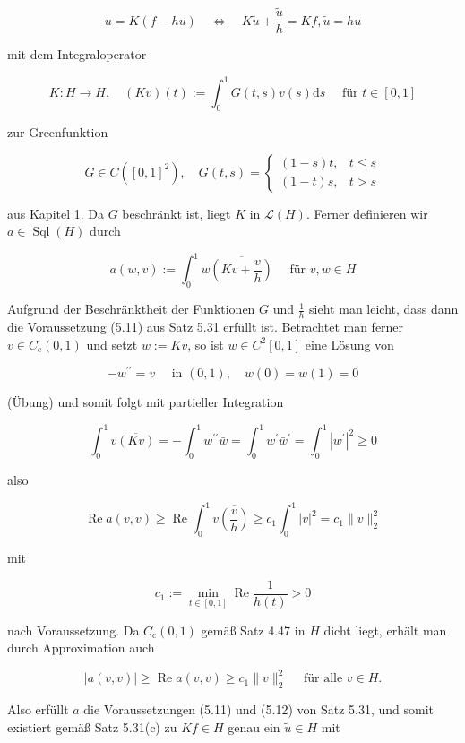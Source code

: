 \documentclass[10pt, letterpaper]{article}
\begin{document}
$$
u=K(f-h u) \quad \Longleftrightarrow \quad K \tilde{u}+\frac{\tilde{u}}{h}=K f, \tilde{u}=h u
$$

mit dem Integraloperator

$$
K: H \rightarrow H, \quad(K v)(t):=\int_{0}^{1} G(t, s) v(s) \mathrm{d} s \quad \text { für } t \in[0,1]
$$

zur Greenfunktion

$$
G \in C\left([0,1]^{2}\right), \quad G(t, s)= \begin{cases}(1-s) t, & t \leq s \\ (1-t) s, & t>s\end{cases}
$$

aus Kapitel 1. Da $G$ beschränkt ist, liegt $K$ in $\mathcal{L}(H)$. Ferner definieren wir $a \in \operatorname{Sql}(H)$ durch

$$
a(w, v):=\int_{0}^{1} w \overline{\left(K v+\frac{v}{h}\right)} \quad \text { für } v, w \in H
$$

Aufgrund der Beschränktheit der Funktionen $G$ und $\frac{1}{h}$ sieht man leicht, dass dann die Voraussetzung (5.11) aus Satz 5.31 erfüllt ist. Betrachtet man ferner $v \in C_{\mathrm{c}}(0,1)$ und setzt $w:=K v$, so ist $w \in C^{2}[0,1]$ eine Lösung von

$$
-w^{\prime \prime}=v \quad \text { in }(0,1), \quad w(0)=w(1)=0
$$

(Übung) und somit folgt mit partieller Integration

$$
\int_{0}^{1} v \overline{(K v)}=-\int_{0}^{1} w^{\prime \prime} \bar{w}=\int_{0}^{1} w^{\prime} \bar{w}^{\prime}=\int_{0}^{1}\left|w^{\prime}\right|^{2} \geq 0
$$

also

$$
\operatorname{Re} a(v, v) \geq \operatorname{Re} \int_{0}^{1} v \overline{\left(\frac{v}{h}\right)} \geq c_{1} \int_{0}^{1}|v|^{2}=c_{1}\|v\|_{2}^{2}
$$

mit

$$
c_{1}:=\min _{t \in[0,1]} \operatorname{Re} \frac{1}{h(t)}>0
$$

nach Voraussetzung. Da $C_{\mathrm{c}}(0,1)$ gemäß Satz 4.47 in $H$ dicht liegt, erhält man durch Approximation auch

$$
|a(v, v)| \geq \operatorname{Re} a(v, v) \geq c_{1}\|v\|_{2}^{2} \quad \text { für alle } v \in H .
$$

Also erfüllt $a$ die Voraussetzungen (5.11) und (5.12) von Satz 5.31, und somit existiert gemäß Satz 5.31(c) zu $K f \in H$ genau ein $\tilde{u} \in H$ mit
\end{document}
